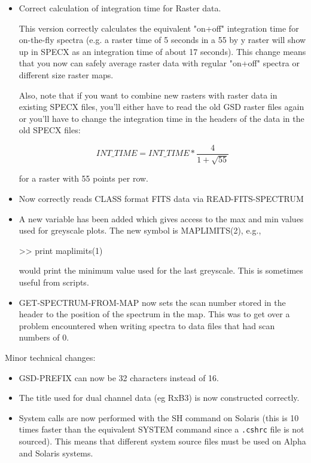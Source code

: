 \documentclass[twoside,11pt,nolof]{starlink}
\begin{document}
\begin{itemize}
\item Correct calculation of integration time for Raster data.

     This version correctly calculates the equivalent "on+off"
     integration time for on-the-fly spectra (e.g. a raster time of 5
     seconds in a 55 by y raster will show up in SPECX as an
     integration time of about 17 seconds). This change means that you
     now can safely average raster data with regular "on+off" spectra
     or different size raster maps.

     Also, note that if you want to combine new rasters with raster
     data in existing SPECX files, you'll either have to read the old
     GSD raster files again or you'll have to change the integration
     time in the headers of the data in the old SPECX files:

\[
         INT\_TIME = INT\_TIME * \frac{4}{1+\sqrt{55}}
\]

     for a raster with 55 points per row.

\item Now correctly reads CLASS format FITS data via READ-FITS-SPECTRUM

\item A new variable has been added which gives access to the max and min
     values used for greyscale plots. The new symbol is MAPLIMITS(2), e.g.,
\begin{terminalv}
>> print maplimits(1)
\end{terminalv}

   would print the minimum value used for the last greyscale.
     This is sometimes useful from scripts.

\item GET-SPECTRUM-FROM-MAP now sets the scan number stored in the header
     to the position of the spectrum in the map. This was to get over
     a problem encountered when writing spectra to data files that had
     scan numbers of 0.

\end{itemize}

Minor technical changes:

\begin{itemize}

\item GSD-PREFIX can now be 32 characters instead of 16.

\item The title used for dual channel data (eg RxB3) is now constructed
      correctly.

\item System calls are now performed with the SH command on Solaris
      (this is 10 times faster than the equivalent SYSTEM command
      since a \texttt{.cshrc} file is not sourced).  This means that different
      system source files must be used on Alpha and Solaris systems.

\end{itemize}
\end{document}
